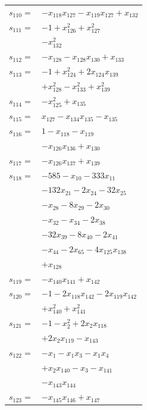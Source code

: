 \begin{longtable}{@{}r@{\;}l@{}}
\(s_{110}=\) & \(\displaystyle -x_{118}x_{127} -x_{119}x_{127} +x_{132}\) \\[3pt]
\(s_{111}=\) & \(\displaystyle -1 +x_{126}^{2} +x_{127}^{2}\) \\
 & \(\displaystyle -x_{132}^{2}\) \\[3pt]
\(s_{112}=\) & \(\displaystyle -x_{128} -x_{128}x_{130} +x_{133}\) \\[3pt]
\(s_{113}=\) & \(\displaystyle -1 +x_{124}^{2} +2x_{124}x_{139}\) \\
 & \(\displaystyle +x_{128}^{2} -x_{133}^{2} +x_{139}^{2}\) \\[3pt]
\(s_{114}=\) & \(\displaystyle -x_{125}^{2} +x_{135}\) \\[3pt]
\(s_{115}=\) & \(\displaystyle x_{127} -x_{134}x_{135} -x_{135}\) \\[3pt]
\(s_{116}=\) & \(\displaystyle 1 -x_{118} -x_{119}\) \\
 & \(\displaystyle -x_{126}x_{136} +x_{130}\) \\[3pt]
\(s_{117}=\) & \(\displaystyle -x_{126}x_{137} +x_{139}\) \\[3pt]
\(s_{118}=\) & \(\displaystyle -585 -x_{10} -333x_{11}\) \\
 & \(\displaystyle -132x_{21} -2x_{24} -32x_{25}\) \\
 & \(\displaystyle -x_{28} -8x_{29} -2x_{30}\) \\
 & \(\displaystyle -x_{32} -x_{34} -2x_{38}\) \\
 & \(\displaystyle -32x_{39} -8x_{40} -2x_{41}\) \\
 & \(\displaystyle -x_{44} -2x_{65} -4x_{125}x_{138}\) \\
 & \(\displaystyle +x_{128}\) \\[3pt]
\(s_{119}=\) & \(\displaystyle -x_{140}x_{141} +x_{142}\) \\[3pt]
\(s_{120}=\) & \(\displaystyle -1 -2x_{118}x_{142} -2x_{119}x_{142}\) \\
 & \(\displaystyle +x_{140}^{2} +x_{141}^{2}\) \\[3pt]
\(s_{121}=\) & \(\displaystyle -1 -x_{2}^{2} +2x_{2}x_{118}\) \\
 & \(\displaystyle +2x_{2}x_{119} -x_{143}\) \\[3pt]
\(s_{122}=\) & \(\displaystyle -x_{1} -x_{1}x_{3} -x_{1}x_{4}\) \\
 & \(\displaystyle +x_{2}x_{140} -x_{3} -x_{141}\) \\
 & \(\displaystyle -x_{143}x_{144}\) \\[3pt]
\(s_{123}=\) & \(\displaystyle -x_{145}x_{146} +x_{147}\) \\[3pt]

\end{longtable}
